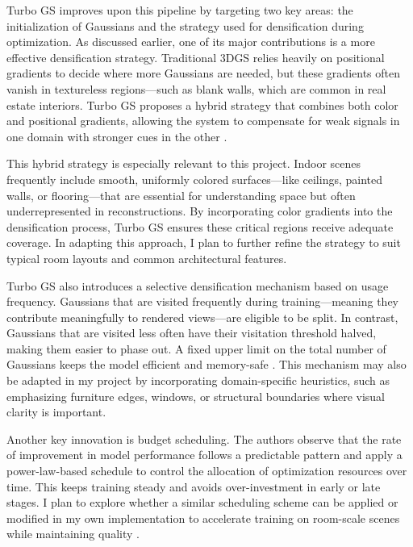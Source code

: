 \documentclass[10pt,twocolumn]{article}
\begin{document}
Turbo GS improves upon this pipeline by targeting two key areas: the initialization of Gaussians and the strategy used for densification during optimization. As discussed earlier, one of its major contributions is a more effective densification strategy. Traditional 3DGS relies heavily on positional gradients to decide where more Gaussians are needed, but these gradients often vanish in textureless regions—such as blank walls, which are common in real estate interiors. Turbo GS proposes a hybrid strategy that combines both color and positional gradients, allowing the system to compensate for weak signals in one domain with stronger cues in the other \cite{lu2024turbogsaccelerating3dgaussian}.

This hybrid strategy is especially relevant to this project. Indoor scenes frequently include smooth, uniformly colored surfaces—like ceilings, painted walls, or flooring—that are essential for understanding space but often underrepresented in reconstructions. By incorporating color gradients into the densification process, Turbo GS ensures these critical regions receive adequate coverage. In adapting this approach, I plan to further refine the strategy to suit typical room layouts and common architectural features.

Turbo GS also introduces a selective densification mechanism based on usage frequency. Gaussians that are visited frequently during training—meaning they contribute meaningfully to rendered views—are eligible to be split. In contrast, Gaussians that are visited less often have their visitation threshold halved, making them easier to phase out. A fixed upper limit on the total number of Gaussians keeps the model efficient and memory-safe \cite{lu2024turbogsaccelerating3dgaussian}. This mechanism may also be adapted in my project by incorporating domain-specific heuristics, such as emphasizing furniture edges, windows, or structural boundaries where visual clarity is important.

Another key innovation is budget scheduling. The authors observe that the rate of improvement in model performance follows a predictable pattern and apply a power-law-based schedule to control the allocation of optimization resources over time. This keeps training steady and avoids over-investment in early or late stages. I plan to explore whether a similar scheduling scheme can be applied or modified in my own implementation to accelerate training on room-scale scenes while maintaining quality \cite{lu2024turbogsaccelerating3dgaussian}.
\end{document}
